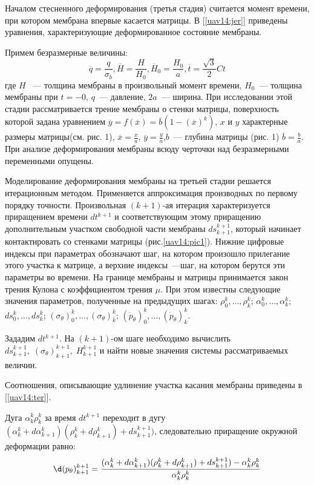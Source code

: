 \documentclass[a4paper,12pt, openany]{memoir}
\numberwithin{equation}{chapter}
\numberwithin{figure}{chapter}
\begin{document}
Началом стесненного деформирования (третья стадия) считается момент времени, при котором мембрана впервые касается матрицы. В [\ref{uav14:jer}] приведены уравнения, характеризующие деформированное состояние мембраны.

Примем безразмерные величины:
 $$\overline{q} = \dfrac{q}{\sigma_b}, \overline{H} = \dfrac{H}{H_0}, \overline{H}_0 = \dfrac{H_0}{a}, \overline{t} = \dfrac{\sqrt 3}{2}Ct$$
где $H$ ~--- толщина мембраны в произвольный момент времени, $H_0$~--- толщина мембраны при $t = -0$, $q$~--- давление, $2a$~--- ширина. При исследовании этой стадии рассматривается трение мембраны о стенки матрицы, поверхность которой задана уравнением $\overline{y} = f(\overline{x}) = \overline{b}(1-(\overline{x})^k)$, $x$ и $y$ характерные размеры матрицы(см. рис. 1), $\overline{x} = \frac x a$, $\overline{y} = \frac y a$,$b$~--- глубина матрицы (рис. 1) $\overline{b} = \frac b a$. При анализе деформирования мембраны всюду черточки над безразмерными переменными опущены.

 Моделирование деформирования мембраны на третьей стадии решается итерационным методом. Применяется аппроксимация производных по первому порядку точности. Произвольная $(k+1)$-ая итерация характеризуется приращением времени $dt^{k+1}$ и соответствующим этому приращению дополнительным участком свободной части мембраны $ds^{k+1}_{k+1}$, который начинает контактировать со стенками матрицы (рис.\ref{uav14:pic1}). Нижние цифровые индексы при параметрах обозначают шаг, на котором произошло прилегание этого участка к матрице, а верхние индексы~---шаг, на котором берутся эти параметры во времени. На границе мембраны и матрицы принимается закон трения Кулона с коэффициентом трения $\mu$. При этом известны следующие значения параметров, полученные на предыдущих шагах: $\rho_0^k,\ldots,\rho_k^k$; $\alpha_0^k,\ldots,\alpha_k^k$; $ds_0^k,\ldots,ds_k^k$; $(\sigma_\theta)_0^k,\ldots,(\sigma_\theta)_k^k$; $(\dot{p}_\theta)_0^k,\ldots,(\dot{p}_\theta)_k^k$.
 
 Зададим $dt^{k+1}$. На $(k+1)$-ом шаге необходимо вычислить $ds^{k+1}_{k+1},\; (\sigma_\theta)_{k+1}^{k+1},\;H_{k+1}^{k+1}$ и найти новые значения
 системы рассматриваемых величин.
 
 Соотношения, описывающие удлинение участка касания мембраны приведены в [\ref{uav14:ter}].
 
 Дуга $\alpha_k^k\rho_k^k$ за время $dt^{k+1}$ переходит в дугу $(\alpha_k^k+d\alpha_{k+1}^k)(\rho_k^k+d\rho_{k+1}^k) + ds_{k+1}^{k+1})$, следовательно
 приращение окружной деформации равно:
\begin{equation}
\d(p_\theta)^{k+1}_{k+1} = \dfrac{(\alpha_k^k+d\alpha_{k+1}^k)(\rho_k^k+d\rho_{k+1}^k) + ds_{k+1}^{k+1}) - \alpha_k^k\rho_k^k}{\alpha_k^k\rho_k^k}
\label{uav14:f1.5}
\end{equation}
\end{document}
